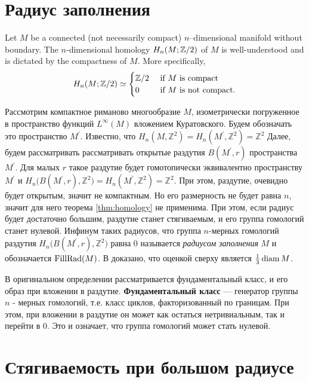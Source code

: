 \documentclass[11pt,twoside
]{article}
\begin{document}
\section{Радиус заполнения}
\begin{thm}
  \label{thm:homology}
  Let $M$ be a connected (not necessarily compact) $n$--dimensional
  manifold without boundary.
  The $n$-dimensional homology $H_n(M;{\mathbb Z}/2)$ of $M$ is
  well-understood and is dictated by the compactness of $M$.
  More specifically,
  \begin{equation}\label{eq:fund-cls}
    H_n(M;{\mathbb Z}/2)\simeq
    \begin{cases}
      {\mathbb Z}/2&\text{ if }M\text{ is compact} \\
      0&\text{ if }M\text{ is not compact}.
    \end{cases}
  \end{equation}
\end{thm}
Рассмотрим компактное риманово многообразие $M$, изометрически
погруженное в пространство функций $L^{\infty}(M)$ вложением
Куратовского. Будем обозначать это пространство $M ^{\prime}$.
Известно, что $H_{n}(M,\mathbb{Z}^{2})= H_{n}(M ^{\prime},
\mathbb{Z}^{2})= \mathbb{Z}^2$ Далее, будем рассматривать
рассматривать открытые раздутия $B(M ^{\prime}, r)$ пространства $M
^{\prime}$. Для малых $r$ такое раздутие будет гомотопически
эквивалентно пространству $M ^{\prime}$ и $H_{n}\big(B(M
^{\prime},r), \mathbb{Z}^{2}\big) = H_{n}(M ^{\prime},
\mathbb{Z}^{2})= \mathbb{Z}^2$. При этом, раздутие, очевидно будет
открытым, значит не компактным. Но его размерность не будет равна \(
n \), значит
для него теорема \ref{thm:homology} не применима. При этом, если
радиус будет достаточно большим, раздутие станет стягиваемым, и его
группа гомологий станет нулевой. Инфинум таких радиусов, что группа
\( n \)-мерных гомологий раздутия \( H_{n}\big(B(M
^{\prime},r), \mathbb{Z}^{2}\big) \) равна \( 0 \) называется
\emph{радиусом заполнения} \( M \) и обозначается \( \operatorname{FillRad}(M)\). В
\cite{katz1983filling} доказано,
что оценкой сверху является \( \frac 1 3 \operatorname{diam} M \).

В оригинальном определении рассматривается фундаментальный класс, и
его образ при вложении в раздутие. \textbf{Фундаментальный класс} ---
генератор группы \( n \) - мерных гомологий, т.е. класс циклов,
факторизованный по границам. При этом, при вложении в раздутие он
может как остаться нетривиальным, так и перейти в \( 0 \). Это и
означает, что группа гомологий может стать нулевой.
\section{Стягиваемость при большом радиусе}
\printbibliography
\end{document}
